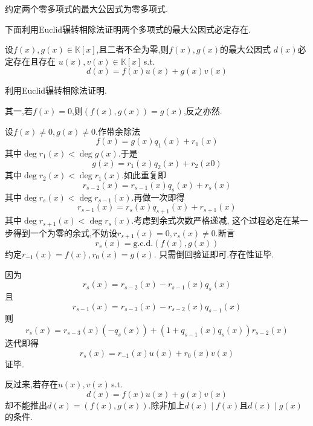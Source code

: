 \begin{red}
\begin{remark}
    约定两个零多项式的最大公因式为零多项式.
\end{remark}
\end{red}
下面利用Euclid辗转相除法证明两个多项式的最大公因式必定存在.
\begin{formal}
\begin{theorem}[最大公因式存在性]\label{thm:最大公因式存在性}
    设$f\left(x\right),g\left(x\right)\in\mathbb{K}\left[x\right]$,且二者不全为零,则$f\left(x\right),g\left(x\right)$的最大公因式
    $d\left(x\right)$必定存在且存在
    $u\left(x\right),v\left(x\right)\in\mathbb{K}\left[x\right]$\,\textup{s.t.}
    \[
    d\left(x\right)=f\left(x\right)u\left(x\right)+g\left(x\right)v\left(x\right)
    \]
\end{theorem}
\begin{Proof}
利用Euclid辗转相除法证明.

其一,若$f\left(x\right)=0$,则$\left(f\left(x\right),g\left(x\right)\right)=g\left(x\right)$,反之亦然.

设$f\left(x\right)\neq 0,g\left(x\right)\neq 0$.作带余除法
\[
f\left(x\right)=g\left(x\right)q_1\left(x\right)+r_1\left(x\right)
\]
其中$\deg r_1\left(x\right)<\deg g\left(x\right)$.于是\[
g\left(x\right)=r_1\left(x\right)q_2\left(x\right)+r_2\left(x0\right)
\]
其中$\deg r_2\left(x\right)<\deg r_1\left(x\right)$.如此重复即
\[
r_{s-2}\left(x\right)=r_{s-1}\left(x\right)q_s\left(x\right)+r_s\left(x\right)
\]
其中$\deg r_s\left(x\right)<\deg r_{s-1}\left(x\right)$.再做一次即得
\[
r_{s-1}\left(x\right)=r_s\left(x\right)q_{s+1}\left(x\right)+r_{s+1}\left(x\right)
\]
其中$\deg r_{s+1}\left(x\right)<\deg r_s\left(x\right)$.考虑到余式次数严格递减,
这个过程必定在某一步得到一个为零的余式,不妨设$r_{s+1}\left(x\right)=0,r_{s}\left(x\right)\neq 0
.$断言
\[
r_s\left(x\right)=\mathrm{g.c.d.}\left(f\left(x\right),g\left(x\right)\right)
\]
约定$r_{-1}\left(x\right)=f\left(x\right),r_0\left(x\right)=
g\left(x\right)$.
只需倒回验证即可.存在性证毕.

因为\[
r_s\left(x\right)=r_{s-2}\left(x\right)-r_{s-1}\left(x\right)q_s\left(x\right)
\]
且\[
r_{s-1}\left(x\right)=r_{s-3}\left(x\right)-r_{s-2}\left(x\right)q_{s-1}\left(x\right)
\]
则\[r_s\left(x\right)=
r_{s-3}\left(x\right)\left(-q_s\left(x\right)\right)+\left(1+q_{s-1}\left(x\right)q_s\left(x\right)\right)
r_{s-2}\left(x\right)
\]
迭代即得
\[
r_s\left(x\right)=r_{-1}\left(x\right)u\left(x\right)+r_0\left(x\right)v\left(x\right)
\]
证毕.
\end{Proof}
\end{formal}
\begin{red}
\begin{remark}
    反过来,若存在$u\left(x\right),v\left(x\right)$\,\textup{s.t.}
    \[
    d\left(x\right)=f\left(x\right)u\left(x\right)+g\left(x\right)v\left(x\right)
    \]
    却不能推出$d\left(x\right)=\left(f\left(x\right),g\left(x\right)\right)$.除非加上$d\left(x\right)\mid f\left(x\right)$且$d\left(x\right)\mid g\left(x\right)$的条件.
\end{remark}
\end{red}
